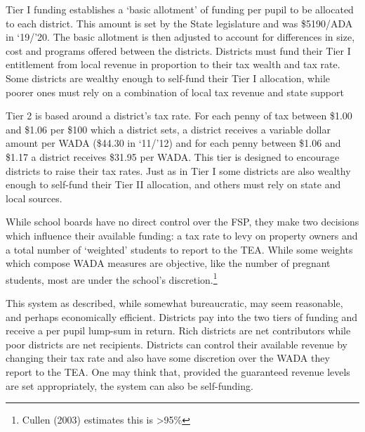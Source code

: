 \documentclass[11pt]{article}
\begin{document}
Tier I funding establishes a ‘basic allotment’ of funding per pupil to be allocated to each district. This amount is set by the State legislature and was \$5190/ADA in ‘19/’20. The basic allotment is then adjusted to account for differences in size, cost and programs offered between the districts. Districts must fund their Tier I entitlement from local revenue in proportion to their tax wealth and tax rate. Some districts are wealthy enough to self-fund their Tier I allocation, while poorer ones must rely on a combination of local tax revenue and state support

Tier 2 is based around a district’s tax rate. For each penny of tax between \$1.00 and \$1.06 per \$100 which a district sets, a district receives a variable dollar amount per WADA (\$44.30 in ‘11/’12) and for each penny between \$1.06 and \$1.17 a district receives \$31.95 per WADA. This tier is designed to encourage districts to raise their tax rates. Just as in Tier I some districts are also wealthy enough to self-fund their Tier II allocation, and others must rely on state and local sources.

While school boards have no direct control over the FSP, they make two decisions which influence their available funding: a tax rate to levy on property owners and a total number of ‘weighted’ students to report to the TEA. While some weights which compose WADA measures are objective, like the number of pregnant students, most are under the school's discretion.\footnote{Cullen (2003) estimates this is \textgreater95\%}

This system as described, while somewhat bureaucratic, may seem reasonable, and perhaps economically efficient. Districts pay into the two tiers of funding and receive a per pupil lump-sum in return. Rich districts are net contributors while poor districts are net recipients. Districts can control their available revenue by changing their tax rate and also have some discretion over the WADA they report to the TEA. One may think that, provided the guaranteed revenue levels are set appropriately, the system can also be self-funding. 
\end{document}
